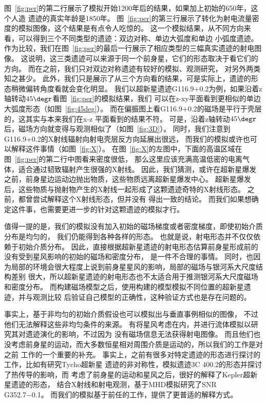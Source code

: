 图~\ref{fig:per}的第二行展示了模拟开始1200年后的结果，如果加上初始的650年，这个人造
遗迹的真实年龄是1850年。
图~\ref{fig:per}的第三行展示了转化为射电流量密度的模拟图像，这个结果是有点令人吃惊的。
这一个模拟结果，从不同方向来看，可以得到三个不同类型的遗迹：双边对称、单边大弧度和单边
小弧度遗迹。
作为比较，我们在图~\ref{fig:per}的最后一行展示了相应类型的三幅真实遗迹的射电图像。
这说明，这三类遗迹可以来源于同一个前身星，它们的形态取决于看它们的方向。
而在之前，我们只对双边对称遗迹有较好的模拟、观测研究\citep{Gaensler1999,Petruk2009a}，
对另外两类知之甚少。
此外，我们只是展示了从三个方向看的结果，可是实际上，遗迹的形态稍微偏转角度看就会变化明显。
我们以超新星遗迹G116.9+0.2为例，如果沿着z轴转动$45\degr$看图~\ref{fig:per}的模拟结果，我们
可以在z-xy平面看到更相似的单边大弧度形态（如图~\ref{fig:45deg}）。
而在偏振图上看G116.9+0.2的磁场是平行于壳层的\citep{Sun2011}，这其实与本来我们在x-z
平面看到的结果不符。
可是，沿着z轴转动$45\degr$后，磁场方向就变得与观测相似了（如图~\ref{fig:3D}）。
同时，我们注意到G116.9+0.2的X射线辐射向射电壳层反方向延展出很远\citep{Pannuti2010}，
而我们的模拟或许也可以解释这件事情（如图~\ref{fig:X}）。
在图~\ref{fig:X}的左图中，下面的高温区域在图~\ref{fig:per}的第二行中图看来密度很低，
那么这里应该充满高温低密的电离气体，适合通过韧致辐射产生很强的X射线。
因此，我们猜测，或许在超新星爆发之前，前身星边运动边抛出物质，这些物质远离超新星爆发中心。
超新星爆发后，这些物质与抛射物产生的X射线一起形成了这颗遗迹奇特的X射线形态。
之前，\citet{Craig1997,Yar-Uyaniker2004,West2016}都曾尝试解释这个X射线形态，但并没有
得出一致的结论。
而我们如果想确定这件事，也需要更进一步的针对这颗遗迹的模拟才行。

值得一提的是，我们的模拟没有加入初始的磁场梯度或者密度梯度，即使初始介质分布是均匀的，
我们仍能得到各种各样的形态。
也就是说，射电形态并不仅仅依赖于初始介质分布。
因此，直接根据超新星遗迹的射电形态估算前身星形成前的没有受到星风影响的初始的磁场和密度分布，
是一件不合理的事情。
同时，也因为局部的环境会很大程度上说到前身星星风的影响，局部的磁场与银河系大尺度结构差别
很大，所以超新星遗迹的射电形态也不太适合用于推测银河系大尺度磁场和密度分布。
而\citet{West2016}构建磁场模型之后，使用构建的模型模拟不同位置的超新星遗迹，并与观测比较
后验证自己模型的正确性，这种验证方式也是存在问题的。

事实上，\citet{Orlando2007}基于非均匀的初始介质假设也可以模拟出与垂直事例相似的图像，
不过他们无法解释这些非均匀条件的来源。
\citet{vanMarle2010}有将星风考虑在内，并进行流体模拟以研究其对遗迹演化的影响，不过因为
没有磁场信息无法获得射电图像。
而且他们也没考虑前身星的运动，而大多数恒星相对周围介质是运动的，所以我们的工作是对之前
工作的一个重要的补充。
事实上，之前有很多对特定遗迹的形态进行探讨的工作，比如\citet{Vigh2011}有研究Tycho超新星
遗迹的非对称性，\citet{Schneiter2006}模拟遗迹3C 400.2的形态并探讨了热传导的影响，而
\citet{Toledo-Roy2014}考虑了前身星的运动和星风之后，很好的解释了Kepler超新星遗迹的形态，
\citet{Toledo-Roy2014a}结合X射线和射电观测，基于MHD模拟研究了SNR G352.7−0.1。
而我们的模拟基于前任的工作，提供了更普适的解释方式。

